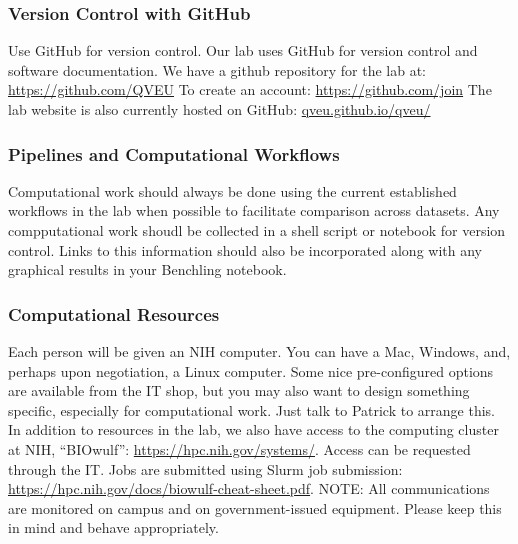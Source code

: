 \documentclass[10pt, a4paper, twocolumn]{article} %
\begin{document}
\subsubsection{Version Control with GitHub}
Use GitHub for version control. Our lab uses GitHub for version control and software documentation. We have a github repository for the lab at: \href{https://github.com/QVEU}{https://github.com/QVEU}
To create an account: \href{https://github.com/join}{https://github.com/join}
The lab website is also currently hosted on GitHub: \href{https://qveu.github.io/QVEU/}{qveu.github.io/qveu/}

\subsubsection{Pipelines and Computational Workflows}
Computational work should always be done using the current established workflows in the lab when possible to facilitate comparison across datasets. Any compputational work shoudl be collected in a shell script or notebook for version control. Links to this information should also be incorporated along with any graphical results in your Benchling notebook.

\subsubsection{Computational Resources}
Each person will be given an NIH computer. You can have a Mac, Windows, and, perhaps upon negotiation, a Linux computer. Some nice pre-configured options are available from the IT shop, but you may also want to design something specific, especially for computational work. Just talk to Patrick to arrange this.
In addition to resources in the lab, we also have access to the computing cluster at NIH, “BIOwulf”: \href{https://hpc.nih.gov/systems/}{https://hpc.nih.gov/systems/}. Access can be requested through the IT. Jobs are submitted using Slurm job submission: \href{https://hpc.nih.gov/docs/biowulf-cheat-sheet.pdf}{https://hpc.nih.gov/docs/biowulf-cheat-sheet.pdf}.
\newline
NOTE: All communications are monitored on campus and on government-issued equipment. Please keep this in mind and behave appropriately.
\end{document}
